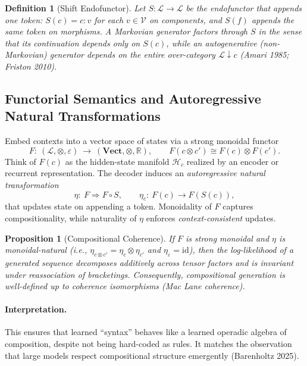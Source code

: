 \documentclass[12pt,a4paper,twoside,openright]{book}
\newtheorem{proposition}[theorem]{Proposition}
\newtheorem{definition}[theorem]{Definition}
\begin{document}
\begin{definition}[Shift Endofunctor]
Let $S:\mathcal{L}\to\mathcal{L}$ be the endofunctor that appends one token: $S(c)=c\!:\!v$ for each $v\in\mathcal{V}$ on components, and $S(f)$ appends the same token on morphisms. A \emph{Markovian} generator factors through $S$ in the sense that its continuation depends only on $S(c)$, while an \emph{autogenerative} (non-Markovian) generator depends on the entire over-category $\mathcal{L}\!\downarrow\!c$ (Amari 1985; Friston 2010).
\end{definition}

\subsection{Functorial Semantics and Autoregressive Natural Transformations}
Embed contexts into a vector space of states via a strong monoidal functor
\[
F:\ (\mathcal{L},\otimes,\varepsilon)\ \longrightarrow\ (\mathbf{Vect},\otimes,\mathbb{R}),
\qquad
F(c\otimes c')\cong F(c)\otimes F(c').
\]
Think of $F(c)$ as the hidden-state manifold $\mathcal{H}_c$ realized by an encoder or recurrent representation. The decoder induces an \emph{autoregressive natural transformation}
\[
\eta:\ F \Longrightarrow F\circ S,\qquad
\eta_c:\ F(c)\to F(S(c)),
\]
that updates state on appending a token. Monoidality of $F$ captures compositionality, while naturality of $\eta$ enforces \emph{context-consistent} updates.

\begin{proposition}[Compositional Coherence]
If $F$ is strong monoidal and $\eta$ is monoidal-natural (i.e., $\eta_{c\otimes c'}=\eta_c\otimes\eta_{c'}$ and $\eta_\varepsilon=\mathrm{id}$), then the log-likelihood of a generated sequence decomposes additively across tensor factors and is invariant under reassociation of bracketings. Consequently, compositional generation is \emph{well-defined} up to coherence isomorphisms (Mac Lane coherence).
\end{proposition}

\paragraph{Interpretation.} This ensures that learned ``syntax'' behaves like a learned operadic algebra of composition, despite not being hard-coded as rules. It matches the observation that large models respect compositional structure emergently (Barenholtz 2025).
\end{document}
